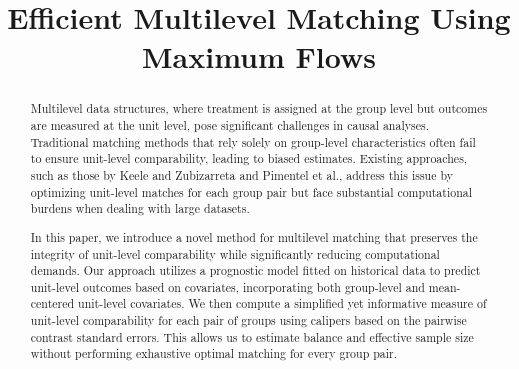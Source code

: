 \documentclass[aoas]{imsart}
\theoremstyle{plain}
\theoremstyle{definition}
\begin{document}
\begin{frontmatter}
\title{Efficient Multilevel Matching Using Maximum Flows}


\begin{abstract}
  Multilevel data structures, where treatment is assigned at the group level but outcomes are measured at the
unit level, pose significant challenges in causal analyses. Traditional matching methods that rely solely on
group-level characteristics often fail to ensure unit-level comparability, leading to biased estimates. Existing
approaches, such as those by Keele and Zubizarreta and Pimentel et al., address this issue by optimizing
unit-level matches for each group pair but face substantial computational burdens when dealing with large
datasets. 

In this paper, we introduce a novel method for multilevel matching that preserves the integrity of unit-level
comparability while significantly reducing computational demands. Our approach utilizes a prognostic model
fitted on historical data to predict unit-level outcomes based on covariates, incorporating both group-level
and mean-centered unit-level covariates. We then compute a simplified yet informative measure of unit-level
comparability for each pair of groups using calipers based on the pairwise contrast standard errors. This
allows us to estimate balance and effective sample size without performing exhaustive optimal matching for
every group pair.
\end{abstract}

\begin{keyword}
\end{keyword}

\end{frontmatter}
\end{document}

